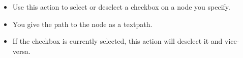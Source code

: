 
\begin{itemize}
\item Use this action to select or deselect a checkbox on a node you specify. 
\item You give the path to the node as a textpath. 
\item If the checkbox is currently selected, this action will deselect it and vice-versa.
\end{itemize}
